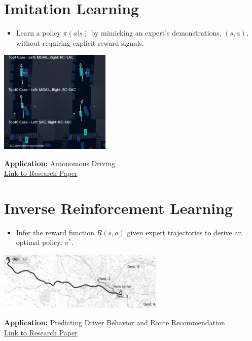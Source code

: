 \documentclass[
  letterpaper,
  DIV=11,
  numbers=noendperiod]{scrreprt}
\providecommand{\tightlist}{%
  \setlength{\itemsep}{0pt}\setlength{\parskip}{0pt}}\usepackage{longtable,booktabs,array}
\begin{document}
\section{Imitation Learning}\label{imitation-learning}

\begin{itemize}
\tightlist
\item
  Learn a policy \(\pi(a|s)\) by mimicking an expert's demonstrations,
  \((s, a)\), without requiring explicit reward signals.
\end{itemize}

\includegraphics[width=2.08333in,height=\textheight,keepaspectratio]{lecture12/images/ImitationLearning.png}

\textbf{Application:} Autonomous Driving\\
\href{https://arxiv.org/pdf/2212.11419}{Link to Research Paper}

\section{Inverse Reinforcement
Learning}\label{inverse-reinforcement-learning}

\begin{itemize}
\tightlist
\item
  Infer the reward function \(R(s, a)\) given expert trajectories to
  derive an optimal policy, \(\pi^*\).
\end{itemize}

\includegraphics[width=3.125in,height=\textheight,keepaspectratio]{lecture12/images/InverseReinforcementLearning.png}

\textbf{Application:} Predicting Driver Behavior and Route
Recommendation\\
\href{https://cdn.aaai.org/AAAI/2008/AAAI08-227.pdf}{Link to Research
Paper}
\end{document}
